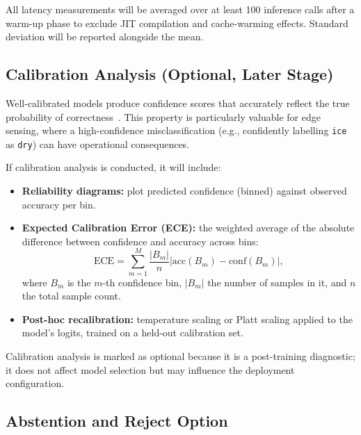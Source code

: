 All latency measurements will be averaged over at least \num{100}
inference calls after a warm-up phase to exclude JIT compilation and
cache-warming effects.  Standard deviation will be reported alongside
the mean.


\subsection{Calibration Analysis (Optional, Later Stage)}
\label{subsec:calibration}

Well-calibrated models produce confidence scores that accurately
reflect the true probability of correctness~\cite{guo2017calibration}.
This property is particularly valuable for edge sensing, where a
high-confidence misclassification (e.g., confidently labelling
\texttt{ice} as \texttt{dry}) can have operational consequences.

If calibration analysis is conducted, it will include:
%
\begin{itemize}
  \item \textbf{Reliability diagrams:} plot predicted confidence
        (binned) against observed accuracy per bin.
  \item \textbf{Expected Calibration Error (ECE):} the weighted
        average of the absolute difference between confidence and
        accuracy across bins:
        \begin{equation}\label{eq:ece}
          \text{ECE} = \sum_{m=1}^{M} \frac{|B_m|}{n}
          \bigl| \mathrm{acc}(B_m) - \mathrm{conf}(B_m) \bigr|,
        \end{equation}
        where $B_m$ is the $m$-th confidence bin, $|B_m|$ the number of
        samples in it, and $n$ the total sample count.
  \item \textbf{Post-hoc recalibration:} temperature scaling or Platt
        scaling applied to the model's logits, trained on a held-out
        calibration set.
\end{itemize}

Calibration analysis is marked as optional because it is a post-training
diagnostic; it does not affect model selection but may influence the
deployment configuration.


\subsection{Abstention and Reject Option}
\label{subsec:abstention}

